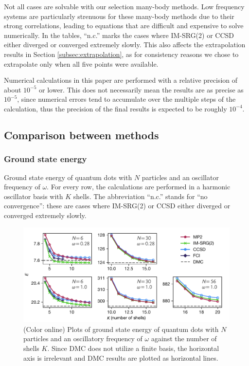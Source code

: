 Not all cases are solvable with our selection many-body methods.  Low frequency systems are particularly strenuous for these many-body methods due to their strong correlations, leading to equations that are difficult and expensive to solve numerically.  In the tables, ``n.c.'' marks the cases where IM-SRG(2) or CCSD either diverged or converged extremely slowly.  This also affects the extrapolation results in Section \ref{subsec:extrapolation}, as for consistency reasons we chose to extrapolate only when all five points were available.

Numerical calculations in this paper are performed with a relative precision of about $10^{-5}$ or lower.  This does not necessarily mean the results are as precise as $10^{-5}$, since numerical errors tend to accumulate over the multiple steps of the calculation, thus the precision of the final results is expected to be roughly $10^{-4}$.

\subsection{Comparison between methods}

\subsubsection{Ground state energy}

\begin{table}
  \centering
  \caption{Ground state energy of quantum dots with $N$ particles and an oscillator frequency of $\omega$.  For every row, the calculations are performed in a harmonic oscillator basis with $K$ shells.  The abbreviation ``n.c.'' stands for ``no convergence'': these are cases where IM-SRG(2) or CCSD either diverged or converged extremely slowly.}
  \label{tab:ground}
  \unskip
\end{table}

\begin{figure}
  \centering
  \includegraphics{fig-gs2.pdf}
  \caption{(Color online) Plots of ground state energy of quantum dots with $N$ particles and an oscillatory frequency of $\omega$ against the number of shells $K$.  Since DMC does not utilize a finite basis, the horizontal axis is irrelevant and DMC results are plotted as horizontal lines.}
  \label{fig:gs}
\end{figure}


